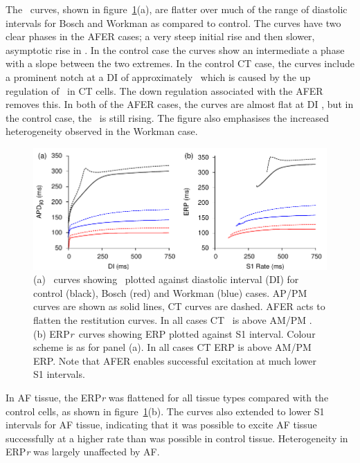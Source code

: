 The \apdr\ curves, shown in figure~\ref{fig:toolkit:afer:apdr}(a), are
flatter over much of the range of diastolic intervals for Bosch and Workman as
compared to control.
The curves have two clear phases in the AFER cases; a very steep initial rise
and then slower, asymptotic rise in \apd.
In the control case the curves show an intermediate a phase with a slope between
the two extremes.
In the control CT case, the curves include a prominent notch at a DI of
approximately \ which is caused by the up regulation of \ in CT
cells.
The down regulation associated with the AFER removes this.
In both of the AFER cases, the curves are almost flat at DI , but in the
control case, the \apd\ is still rising.
The figure also emphasises the increased heterogeneity observed in the Workman
case.


\begin{figure}
\centering
\includegraphics{figures/toolkit/afer/figures/02_APDR}
\caption[AFER APDr and ERPr curves]{
\label{fig:toolkit:afer:apdr}
(a)
\apdr\ curves showing \apd\ plotted against diastolic interval (DI) for control
(black), Bosch (red) and Workman (blue) cases.
AP/PM curves are shown as solid lines, CT curves are dashed.
AFER acts to flatten the restitution curves.
In all cases CT \apd\ is above AM/PM \apd.
(b)
ERP\emph{r}\ curves showing ERP plotted against S1 interval.
Colour scheme is as for panel (a).
In all cases CT ERP is above AM/PM ERP.
Note that AFER enables successful excitation at much lower S1 intervals.
}
\end{figure}

In AF tissue, the ERP\emph{r} was flattened for all tissue types compared with
the control cells, as shown in figure~\ref{fig:toolkit:afer:apdr}(b).
The curves also extended to lower S1 intervals for AF tissue, indicating that it
was possible to excite AF tissue successfully at a higher rate than was possible
in control tissue.
Heterogeneity in ERP\emph{r} was largely unaffected by AF.

